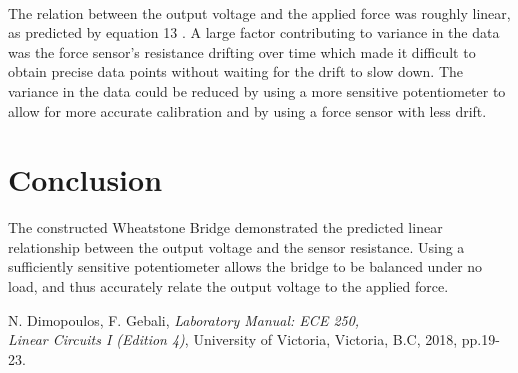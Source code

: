 \documentclass[12pt]{article}
\begin{document}
\paragraph*{}
The relation between the output voltage and the applied force was roughly linear, as predicted by equation 13 \cite{labManual}.
A large factor contributing to variance in the data was the force sensor's resistance drifting over time which made it difficult to obtain precise data points without waiting for the drift to slow down.
The variance in the data could be reduced by using a more sensitive potentiometer to allow for more accurate calibration and by using a force sensor with less drift.

\section{Conclusion}
The constructed Wheatstone Bridge demonstrated the predicted linear relationship between the output voltage and the sensor resistance.
Using a sufficiently sensitive potentiometer allows the bridge to be balanced under no load, and thus accurately relate the output voltage to the applied force.


\newpage
{}
\begin{thebibliography}{1}
    N. Dimopoulos, F. Gebali, \textit{Laboratory Manual: ECE 250, \\ Linear Circuits I (Edition 4)}, University of Victoria, Victoria, B.C, 2018, pp.19-23.
\end{thebibliography}
\end{document}

